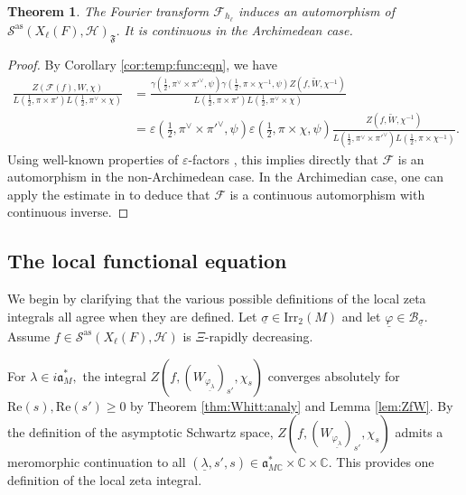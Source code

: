 \documentclass[12pt]{amsart}
\newtheorem{thm}{Theorem}[section]
\theoremstyle{remark}
\numberwithin{equation}{section}
\newcommand{\CC}{\mathbb{C}}
\theoremstyle{definition}
\numberwithin{equation}{subsection}
\begin{document}
\begin{thm} \label{thm:As:FT}
The Fourier transform $\mathcal{F}_{h_\ell}$ induces an automorphism of $\mathcal{S}^{\mathrm{as}}(X_{\ell}(F),\mathcal{H})_{\mathfrak{F}}.$ It is continuous in the Archimedean case.
\end{thm}

\begin{proof}
By Corollary \ref{cor:temp:func:eqn}, we have 
\begin{align*}
    \frac{Z(\mathcal{F}(f),W,\chi)}{L(\tfrac{1}{2},\pi \times \pi')L(\tfrac{1}{2},\pi^{\vee} \times \chi)}&=\frac{\gamma\left(\tfrac{1}{2},\pi^\lor\times\pi'^\lor,\psi\right)\gamma\left(\tfrac{1}{2},\pi\times\chi^{-1},\psi\right)Z(f,\widetilde{W},\chi^{-1})}{L(\tfrac{1}{2},\pi \times \pi')L(\tfrac{1}{2},\pi^{\vee} \times \chi)}\\
    &=\varepsilon(\tfrac{1}{2},\pi^\vee \times \pi'^\vee,\psi)\varepsilon(\tfrac{1}{2},\pi \times \chi,\psi)\frac{ Z(f,\widetilde{W},\chi^{-1})}{L(\tfrac{1}{2},\pi^\lor \times \pi'^\lor)L(\tfrac{1}{2},\pi \times \chi^{-1})}.
\end{align*}
Using well-known properties of $\varepsilon$-factors \cite[Proposition 3.5]{CogdellPCMI}, this implies directly that $\mathcal{F}$ is an automorphism in the non-Archimedean case.  In the Archimedian case, one can apply the estimate in \cite[Proposition 3.23]{DRS:Schwartz} to deduce that $\mathcal{F}$ is a continuous automorphism with continuous inverse.
\end{proof}







 







\subsection{The local functional equation}


 
We begin by clarifying that the various possible definitions of the local zeta integrals all agree when they are defined.  
Let $\underline{\sigma} \in \mathrm{Irr}_2(M)$ and let $\underline{\varphi} \in \mathcal{B}_{\underline{\sigma}}.$
Assume $f \in \mathcal{S}^{\mathrm{as}}(X_\ell(F),\mathcal{H})$ is $\Xi$-rapidly decreasing. 

For $\lambda \in i\mathfrak{a}_M^*,$ the integral $Z(f,(W_{\underline{\varphi_{\lambda}}})_{s'},\chi_s)$ converges absolutely for  $\mathrm{Re}(s),\mathrm{Re}(s') \geq 0$ by Theorem \ref{thm:Whitt:analy} and Lemma \ref{lem:ZfW}.  
By the definition of the asymptotic Schwartz space, $Z(f,(W_{\underline{\varphi_{\lambda}}})_{s'},\chi_s)$ admits a meromorphic continuation to all $(\underline{\lambda},s',s) \in \mathfrak{a}_{M\CC}^* \times \CC \times \CC.$  This provides one definition of the local zeta integral.
\end{document}
